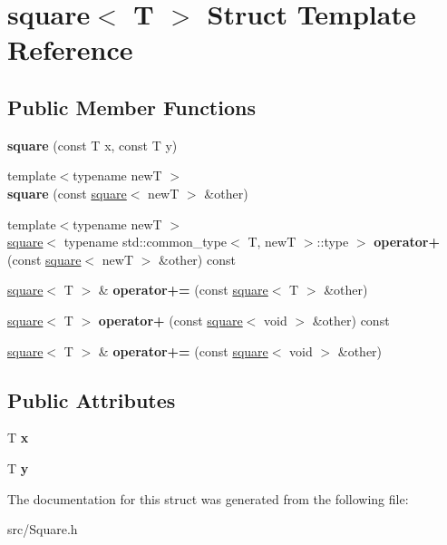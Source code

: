 \hypertarget{structsquare}{}\section{square$<$ T $>$ Struct Template Reference}
\label{structsquare}
\subsection*{Public Member Functions}
\begin{DoxyCompactItemize}
\item 
\mbox{\label{structsquare_a447dd893d605937230bba2861322df6d}} 
{\bfseries square} (const T x, const T y)
\item 
\mbox{\label{structsquare_a3ae63c51c5ae7e6416d94febdfabdba1}} 
{\footnotesize template$<$typename newT $>$ }\\{\bfseries square} (const \hyperlink{structsquare}{square}$<$ newT $>$ \&other)
\item 
\mbox{\label{structsquare_a1379df16b796073695499c59164634a7}} 
{\footnotesize template$<$typename newT $>$ }\\\hyperlink{structsquare}{square}$<$ typename std\+::common\+\_\+type$<$ T, newT $>$\+::type $>$ {\bfseries operator+} (const \hyperlink{structsquare}{square}$<$ newT $>$ \&other) const
\item 
\mbox{\label{structsquare_a449426e468a40af9fbc7a06128553ba1}} 
\hyperlink{structsquare}{square}$<$ T $>$ \& {\bfseries operator+=} (const \hyperlink{structsquare}{square}$<$ T $>$ \&other)
\item 
\mbox{\label{structsquare_a97346a468c39963d3c30ba2649bd10b8}} 
\hyperlink{structsquare}{square}$<$ T $>$ {\bfseries operator+} (const \hyperlink{structsquare}{square}$<$ void $>$ \&other) const
\item 
\mbox{\label{structsquare_acbf660ad49decf4178fbf843a7912251}} 
\hyperlink{structsquare}{square}$<$ T $>$ \& {\bfseries operator+=} (const \hyperlink{structsquare}{square}$<$ void $>$ \&other)
\end{DoxyCompactItemize}
\subsection*{Public Attributes}
\begin{DoxyCompactItemize}
\item 
\mbox{\label{structsquare_a9a6e49424fdfad5fe4ce893bb57ba467}} 
T {\bfseries x}
\item 
\mbox{\label{structsquare_a7b976f9389a2fc271a332b5014dfd1e9}} 
T {\bfseries y}
\end{DoxyCompactItemize}


The documentation for this struct was generated from the following file\+:\begin{DoxyCompactItemize}
\item 
src/Square.\+h\end{DoxyCompactItemize}
